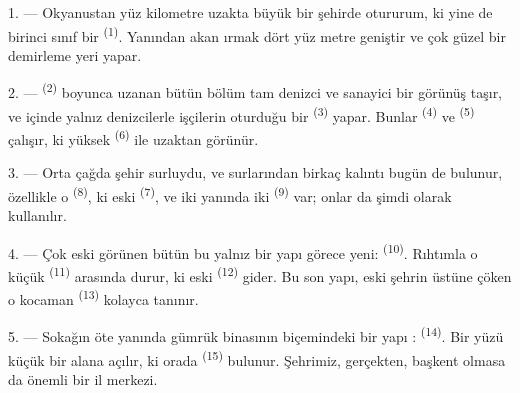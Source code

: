 
\VUsaut{2.0mm}
\VUsaut{3.0mm}
\VUfilet{16mm}
\VUsaut{5.6mm}
\VUsaut{1.4mm}
\VUsaut{2.2mm}

\VUsaut{3.0mm}

1. --- Okyanustan yüz kilometre uzakta büyük bir şehirde otururum, ki yine de
birinci sınıf bir  \textsuperscript{(1)}. Yanından akan ırmak
dört yüz metre geniştir ve çok güzel bir demirleme yeri yapar.

2. ---  \textsuperscript{(2)} boyunca uzanan bütün bölüm tam
denizci ve sanayici bir görünüş taşır, ve içinde yalnız denizcilerle işçilerin
oturduğu bir  \textsuperscript{(3)} yapar. Bunlar
 \textsuperscript{(4)} ve 
\textsuperscript{(5)} çalışır, ki yüksek  \textsuperscript{(6)}
ile  uzaktan görünür.

3. --- Orta çağda şehir surluydu, ve surlarından birkaç kalıntı bugün de
bulunur, özellikle o  \textsuperscript{(8)}, ki eski  \textsuperscript{(7)}, ve iki yanında iki 
\textsuperscript{(9)} var; onlar da şimdi  olarak
kullanılır.

4. --- Çok eski görünen bütün bu  yalnız bir yapı görece
yeni:  \textsuperscript{(10)}. Rıhtımla o küçük
 \textsuperscript{(11)} arasında durur, ki eski
 \textsuperscript{(12)} gider. Bu son yapı, eski
şehrin üstüne çöken o kocaman  \textsuperscript{(13)}
kolayca tanınır.

5. --- Sokağın öte yanında gümrük binasının biçemindeki bir yapı
:  \textsuperscript{(14)}. Bir yüzü
küçük bir alana açılır, ki orada  \textsuperscript{(15)}
bulunur. Şehrimiz, gerçekten, başkent olmasa da önemli bir il merkezi.

